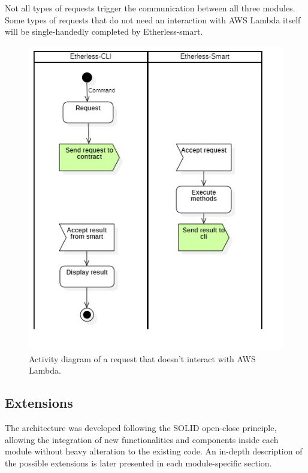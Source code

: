	Not all types of requests trigger the communication between all three modules. Some types of requests that do not need an interaction with AWS Lambda itself will be single-handedly completed by Etherless-smart.
	\begin{figure} [h!]
		\centering
		\includegraphics[width=0.8\linewidth]{diagrammi/generali/activity_diag_pattern1}
		\caption{Activity diagram of a request that doesn't interact with AWS Lambda.}
	\end{figure}
	\pagebreak
	\subsection{Extensions} %
	The architecture was developed following the SOLID open-close principle, allowing the integration of new functionalities and components inside each module without heavy alteration to the existing code. An in-depth description of the possible extensions is later presented in each module-specific section.
